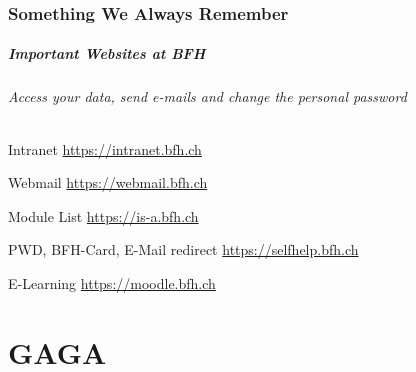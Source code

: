\section{Something We Always Remember}
\sectionpage

\begin{frame}[c]\frametitle{Important Websites at BFH}
  \framesubtitle{Access your data, send e-mails and change the personal password}
  \begin{block}{Intranet}
    \url{https://intranet.bfh.ch}
  \end{block}
  \begin{alertblock}{Webmail}
    \url{https://webmail.bfh.ch}
  \end{alertblock}
  \begin{block}{Module List}
    \url{https://is-a.bfh.ch}
  \end{block}
  \begin{alertblock}{PWD, BFH-Card, E-Mail redirect}
    \url{https://selfhelp.bfh.ch}
  \end{alertblock}
  \begin{block}{E-Learning}
    \url{https://moodle.bfh.ch}
  \end{block}
\end{frame}

\part{GAGA}

\partpage

